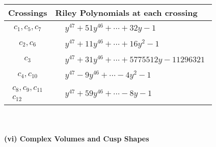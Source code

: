 \documentclass[1p]{elsarticle_modified}
\theoremstyle{definition}
\begin{document}
\begin{tabular}{m{50pt}|m{274pt}}
Crossings & \hspace{64pt}Riley Polynomials at each crossing \\
\hline $$\begin{aligned}c_{1},c_{5},c_{7}\end{aligned}$$&$\begin{aligned}
&y^{47}+51 y^{46}+\cdots+32 y-1
\end{aligned}$\\
\hline $$\begin{aligned}c_{2},c_{6}\end{aligned}$$&$\begin{aligned}
&y^{47}+11 y^{46}+\cdots+16 y^2-1
\end{aligned}$\\
\hline $$\begin{aligned}c_{3}\end{aligned}$$&$\begin{aligned}
&y^{47}+31 y^{46}+\cdots+5775512 y-11296321
\end{aligned}$\\
\hline $$\begin{aligned}c_{4},c_{10}\end{aligned}$$&$\begin{aligned}
&y^{47}-9 y^{46}+\cdots-4 y^2-1
\end{aligned}$\\
\hline $$\begin{aligned}c_{8},c_{9},c_{11}\\c_{12}\end{aligned}$$&$\begin{aligned}
&y^{47}+59 y^{46}+\cdots-8 y-1
\end{aligned}$\\
\hline
\end{tabular}\\~\\
\newpage\flushleft \textbf{(vi) Complex Volumes and Cusp Shapes}
\end{document}
